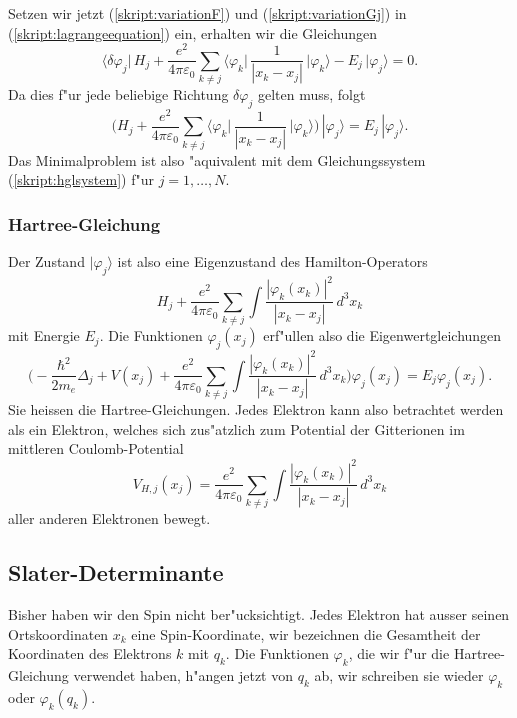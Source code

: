 Setzen wir jetzt (\ref{skript:variationF}) und (\ref{skript:variationGj})
in (\ref{skript:lagrangeequation}) ein, erhalten wir die Gleichungen
\[
\biggl\langle
\delta\varphi_j\biggl|\,
H_j
+
\frac{e^2}{4\pi\varepsilon_0}
\sum_{k\ne j}\biggl\langle\varphi_k\biggl|\,
\frac1{|x_k-x_j|}
\,\biggr|\varphi_k\biggr\rangle-E_j
\,\biggl|\varphi_j \biggr\rangle=0.
\]
Da dies f"ur jede beliebige Richtung $\delta\varphi_j$ gelten muss,
folgt
\begin{equation}
\biggl(
H_j
+
\frac{e^2}{4\pi\varepsilon_0}
\sum_{k\ne j}\biggl\langle\varphi_k\biggl|\,
\frac1{|x_k-x_j|}
\,\biggr|\varphi_k\biggr\rangle\biggr)
\,|\varphi_j \rangle
=
E_j\,|\varphi_j\rangle.
\label{skript:hglsystem}
\end{equation}
Das Minimalproblem ist also "aquivalent mit dem Gleichungssystem
(\ref{skript:hglsystem}) f"ur $j=1,\dots,N$.

\subsubsection{Hartree-Gleichung}
Der Zustand $|\varphi_j\rangle$ ist also eine Eigenzustand des
Hamilton-Operators
\[
H_j
+
\frac{e^2}{4\pi\varepsilon_0}
\sum_{k\ne j}\int \frac{|\varphi_k(x_k)|^2}{|x_k-x_j|}\,d^3x_k
\]
mit Energie $E_j$. Die Funktionen $\varphi_j(x_j)$ erf"ullen also
die Eigenwertgleichungen
\[
\biggl(
-\frac{\hbar^2}{2m_e}\Delta_j
+V(x_j)
+\frac{e^2}{4\pi\varepsilon_0}
\sum_{k\ne j}\int\frac{|\varphi_k(x_k)|^2}{|x_k-x_j|}\,d^3x_k\biggr)\varphi_j(x_j) = E_j\varphi_j(x_j).
\]
Sie heissen die Hartree-Gleichungen.
Jedes Elektron kann also betrachtet
werden als ein Elektron, welches sich zus"atzlich zum Potential der Gitterionen
im mittleren Coulomb-Potential
\[
V_{H,j}(x_j)
=
\frac{e^2}{4\pi\varepsilon_0}
\sum_{k\ne j}\int\frac{|\varphi_k(x_k)|^2}{|x_k-x_j|}\,d^3x_k
\]
aller anderen Elektronen bewegt.

\subsection{Slater-Determinante}
Bisher haben wir den Spin nicht ber"ucksichtigt.
Jedes Elektron hat ausser seinen Ortskoordinaten $x_k$ eine Spin-Koordinate,
wir bezeichnen die Gesamtheit der Koordinaten des Elektrons $k$ mit $q_k$.
Die Funktionen $\varphi_k$, die wir f"ur die Hartree-Gleichung verwendet
haben, h"angen jetzt von $q_k$ ab, wir schreiben sie wieder $\varphi_k$ 
oder $\varphi_k(q_k)$.

